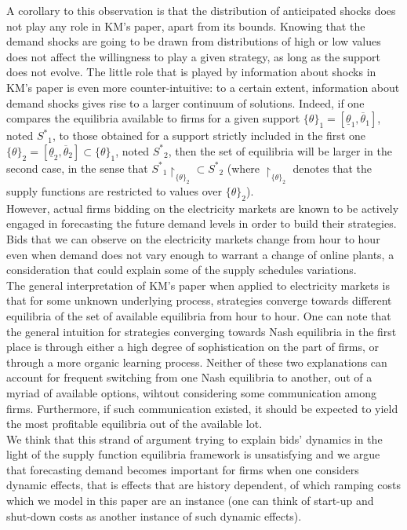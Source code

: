 A corollary to this observation is that the distribution of anticipated shocks does not play any role in KM's paper, apart from its bounds. Knowing that the demand shocks are going to be drawn from distributions of high or low values does not affect the willingness to play a given strategy, as long as the support does not evolve. The little role that is played by information about shocks in KM's paper is even more counter-intuitive: to a certain extent, information about demand shocks gives rise to a larger continuum of solutions. Indeed, if one compares the equilibria available to firms for a given support $\{\theta\}_1=[\underline{\theta}_1, \overline{\theta}_1]$, noted ${S^*}_1$, to those obtained for a support strictly included in the first one $\{\theta\}_2=[\underline{\theta}_2, \overline{\theta}_2]\subset\{\theta\}_1$, noted ${S^*}_2$, then the set of equilibria will be larger in the second case, in the sense that $ {S^*}_1\restriction_{\{\theta\}_2}\subset {S^*}_2$ (where $\restriction_{\{\theta\}_2}$ denotes that the supply functions are restricted to values over $\{\theta\}_2$). \\

However, actual firms bidding on the electricity markets are known to be actively engaged in forecasting the future demand levels in order to build their strategies. Bids that we can observe on the electricity markets change from hour to hour even when demand does not vary enough to warrant a change of online plants, a consideration that could explain some of the supply schedules variations. \\

The general interpretation of KM's paper when applied to electricity markets is that for some unknown underlying process, strategies converge towards different equilibria of the set of available equilibria from hour to hour. One can note that the general intuition for strategies converging towards Nash equilibria in the first place is through either a high degree of sophistication on the part of firms, or through a more organic learning process. Neither of these two explanations can account for frequent switching from one Nash equilibria to another, out of a myriad of available options, wihtout considering some communication among firms. Furthermore, if such communication existed, it should be expected to yield the most profitable equilibria out of the available lot.\\ 

We think that this strand of argument trying to explain bids' dynamics in the light of the supply function equilibria framework is unsatisfying and we argue that forecasting demand becomes important for firms when one considers dynamic effects, that is effects that are history dependent, of which ramping costs which we model in this paper are an instance (one can think of start-up and shut-down costs as another instance of such dynamic effects). \\

